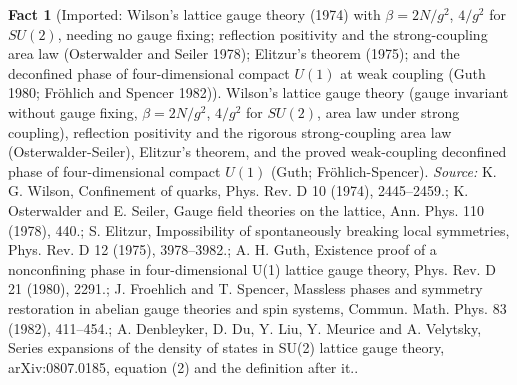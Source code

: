 \documentclass[11pt]{article}
\theoremstyle{definition}
\newtheorem{fact}[theorem]{Fact}
\theoremstyle{plain}
\begin{document}
\begin{fact}[Imported: Wilson's lattice gauge theory (1974) with $\beta = 2N/g^{2}$, $4/g^{2}$ for $SU(2)$, needing no gauge fixing; reflection positivity and the strong-coupling area law (Osterwalder and Seiler 1978); Elitzur's theorem (1975); and the deconfined phase of four-dimensional compact $U(1)$ at weak coupling (Guth 1980; Fr\"ohlich and Spencer 1982)]\label{c:synthesis.imported-wilson-lattice-gauge-theory-and-strong-coupling-confinement}
Wilson's lattice gauge theory (gauge invariant without gauge fixing, $\beta = 2N/g^{2}$, $4/g^{2}$ for $SU(2)$, area law under strong coupling), reflection positivity and the rigorous strong-coupling area law (Osterwalder-Seiler), Elitzur's theorem, and the proved weak-coupling deconfined phase of four-dimensional compact $U(1)$ (Guth; Fr\"ohlich-Spencer).
\emph{Source:} K. G. Wilson, Confinement of quarks, Phys. Rev. D 10 (1974), 2445--2459.; K. Osterwalder and E. Seiler, Gauge field theories on the lattice, Ann. Phys. 110 (1978), 440.; S. Elitzur, Impossibility of spontaneously breaking local symmetries, Phys. Rev. D 12 (1975), 3978--3982.; A. H. Guth, Existence proof of a nonconfining phase in four-dimensional U(1) lattice gauge theory, Phys. Rev. D 21 (1980), 2291.; J. Froehlich and T. Spencer, Massless phases and symmetry restoration in abelian gauge theories and spin systems, Commun. Math. Phys. 83 (1982), 411--454.; A. Denbleyker, D. Du, Y. Liu, Y. Meurice and A. Velytsky, Series expansions of the density of states in SU(2) lattice gauge theory, arXiv:0807.0185, equation (2) and the definition after it..
\end{fact}
\end{document}
